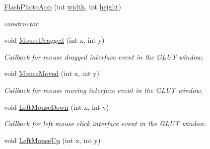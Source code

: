 \begin{DoxyCompactItemize}
\item 
\hyperlink{classimage__tools_1_1FlashPhotoApp_ae86078388c8a06bae8e708ed15ea4638}{Flash\+Photo\+App} (int \hyperlink{classimage__tools_1_1BaseGfxApp_a2fe403c5392f624477c2ce4429f1a7b5}{width}, int \hyperlink{classimage__tools_1_1BaseGfxApp_aa961e13a7a8e6062204223cc33ac7503}{height})\hypertarget{classimage__tools_1_1FlashPhotoApp_ae86078388c8a06bae8e708ed15ea4638}{}\label{classimage__tools_1_1FlashPhotoApp_ae86078388c8a06bae8e708ed15ea4638}

\begin{DoxyCompactList}\small\item\em constructor \end{DoxyCompactList}\item 
void \hyperlink{classimage__tools_1_1FlashPhotoApp_abe6a6b7ac7664639d5208affe277f6ee}{Mouse\+Dragged} (int x, int y)\hypertarget{classimage__tools_1_1FlashPhotoApp_abe6a6b7ac7664639d5208affe277f6ee}{}\label{classimage__tools_1_1FlashPhotoApp_abe6a6b7ac7664639d5208affe277f6ee}

\begin{DoxyCompactList}\small\item\em Callback for mouse dragged interface event in the G\+L\+UT window. \end{DoxyCompactList}\item 
void \hyperlink{classimage__tools_1_1FlashPhotoApp_abac618c1f5a236dc678674de050cd205}{Mouse\+Moved} (int x, int y)
\begin{DoxyCompactList}\small\item\em Callback for mouse moving interface event in the G\+L\+UT window. \end{DoxyCompactList}\item 
void \hyperlink{classimage__tools_1_1FlashPhotoApp_a6ad65b17915b17d539bf82fb07710c7f}{Left\+Mouse\+Down} (int x, int y)\hypertarget{classimage__tools_1_1FlashPhotoApp_a6ad65b17915b17d539bf82fb07710c7f}{}\label{classimage__tools_1_1FlashPhotoApp_a6ad65b17915b17d539bf82fb07710c7f}

\begin{DoxyCompactList}\small\item\em Callback for left mouse click interface event in the G\+L\+UT window. \end{DoxyCompactList}\item 
void \hyperlink{classimage__tools_1_1FlashPhotoApp_ab2fb593952915731ec50da0a4a20d097}{Left\+Mouse\+Up} (int x, int y)\hypertarget{classimage__tools_1_1FlashPhotoApp_ab2fb593952915731ec50da0a4a20d097}{}\label{classimage__tools_1_1FlashPhotoApp_ab2fb593952915731ec50da0a4a20d097}


\end{DoxyCompactItemize}
